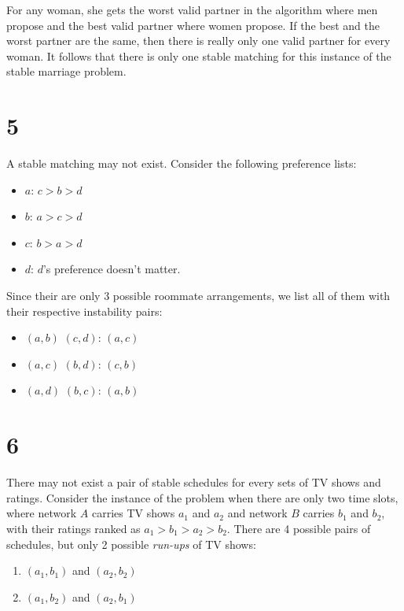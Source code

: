 \documentclass{article}
\begin{document}
For any woman, she gets the worst valid partner in the algorithm where men propose and the best valid partner where women propose. If the best and the worst partner are the same, then there is really only one valid partner for every woman. It follows that there is only one stable matching for this instance of the stable marriage problem.

\section*{5}

A stable matching may not exist. Consider the following preference lists:

\begin{itemize}
    \item $a$: $c > b > d$
    \item $b$: $a > c > d$
    \item $c$: $b > a > d$
    \item $d$: $d$'s preference doesn't matter.
\end{itemize}

Since their are only 3 possible roommate arrangements, we list all of them with their respective instability pairs:

\begin{itemize}
    \item $(a, b)$ $(c, d)$: $(a, c)$
    \item $(a, c)$ $(b, d)$: $(c, b)$
    \item $(a, d)$ $(b, c)$: $(a, b)$
\end{itemize}

\section*{6}

There may not exist a pair of stable schedules for every sets of TV shows and ratings. Consider the instance of the problem when there are only two time slots, where network $A$ carries TV shows $a_1$ and $a_2$ and network $B$ carries $b_1$ and $b_2$, with their ratings ranked as $a_1 > b_1 > a_2 > b_2$. There are 4 possible pairs of schedules, but only 2 possible \emph{run-ups} of TV shows:

\begin{enumerate}
    \item $(a_1, b_1)$ and $(a_2, b_2)$
    \item $(a_1, b_2)$ and $(a_2, b_1)$
\end{enumerate}
\end{document}
